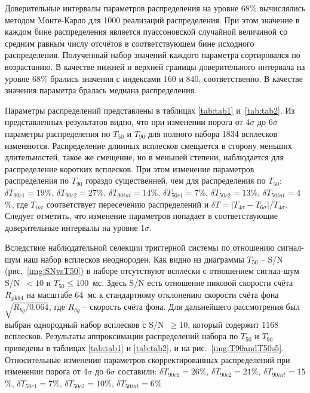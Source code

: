Доверительные интервалы параметров распределения на уровне 68\% вычислялись методом Mонте-Карло для 1000 реализаций распределения. При этом значение в каждом бине распределения является пуассоновской случайной величиной со средним равным числу отсчётов в соответствующем бине исходного распределения. Полученный набор значений каждого параметра сортировался по возрастанию. В качестве нижней и верхней границы доверительного интервала на уровне 68\% брались значения с индексами 160 и 840, соответственно. В качестве значения параметра бралась медиана распределения.

Параметры распределений представлены в таблицах \ref{tab:tab1} и~\ref{tab:tab2}. Из представленных результатов видно, что при изменении порога от 4$\sigma$ до 6$\sigma$ параметры распределения по $T_{50}$ и $T_{90}$ для полного набора 1834 всплесков изменяются. Распределение длинных всплесков смещается в сторону меньших длительностей, такое же смещение, но в меньшей степени, наблюдается для распределение коротких всплесков. При этом изменение параметров распределения по $T_{90}$ гораздо существенней, чем для распределения по $T_{50}$: $\delta T_{90c1} = 19$\%, $\delta T_{90c2} = 27$\%, $\delta T_{90int} = 14$\%, $\delta T_{50c1} = 7$\%, $\delta T_{50c2} = 13$\%, $\delta T_{50int} = 4$\%, где $T_{int}$ соответствует пересечению распределений и $\delta T =|T_{4\sigma}-T_{6\sigma}| / T_{4\sigma}$. Следует отметить, что изменение параметров попадает в соответствующие доверительные интервалы на уровне 1$\sigma$. 

Вследствие наблюдательной селекции триггерной системы по отношению сигнал-шум наш набор всплесков неоднороден. Как видно из диаграммы $T_{50}$ -- S/N (рис.~\ref{img:SNvsT50}) в наборе отсутствуют всплески с отношением сигнал-шум S/N~$< 10$ и $T_{50} \leq 100$~мс. Здесь S/N есть отношение пиковой скорости счёта $R_{\mathrm{pk}64}$ на масштабе 64~мс к стандартному отклонению скорости счёта фона $\sqrt{R_{bg}/0.064}$, где $R_{bg}$ -- скорость счёта фона. Для дальнейшего рассмотрения был выбран однородный набор всплесков с S/N~$\geq 10$, который содержит 1168 всплесков. Результаты аппроксимации распределений набора по $T_{50}$ и $T_{90}$ приведены в таблицах \ref{tab:tab1} и \ref{tab:tab2}, и на рис.~\ref{img:T90andT50s5}. Относительные изменения параметров скорректированных распределений при изменении порога от 4$\sigma$ до 6$\sigma$ составили: $\delta T_{90c1} = 26$\%, $\delta T_{90c2} = 21$\%, $\delta T_{90int} = 15$\%, $\delta T_{50c1} = 7$\%, $\delta T_{50c2} = 10$\%, $\delta T_{50int} = 6$\%

